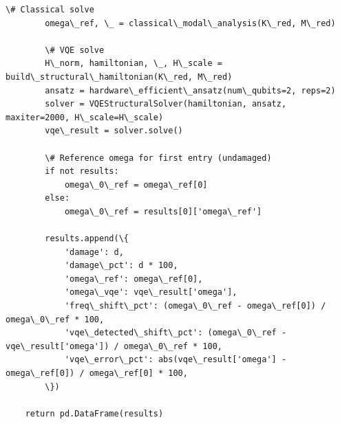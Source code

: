 \documentclass[12pt, a4paper]{article}
\begin{document}
\begin{lstlisting}[style=codestyle, caption={{novel_study.py --- Ill-Conditioning & Damage Detection}}]
        \# Classical solve
        omega\_ref, \_ = classical\_modal\_analysis(K\_red, M\_red)

        \# VQE solve
        H\_norm, hamiltonian, \_, H\_scale = build\_structural\_hamiltonian(K\_red, M\_red)
        ansatz = hardware\_efficient\_ansatz(num\_qubits=2, reps=2)
        solver = VQEStructuralSolver(hamiltonian, ansatz, maxiter=2000, H\_scale=H\_scale)
        vqe\_result = solver.solve()

        \# Reference omega for first entry (undamaged)
        if not results:
            omega\_0\_ref = omega\_ref[0]
        else:
            omega\_0\_ref = results[0]['omega\_ref']

        results.append(\{
            'damage': d,
            'damage\_pct': d * 100,
            'omega\_ref': omega\_ref[0],
            'omega\_vqe': vqe\_result['omega'],
            'freq\_shift\_pct': (omega\_0\_ref - omega\_ref[0]) / omega\_0\_ref * 100,
            'vqe\_detected\_shift\_pct': (omega\_0\_ref - vqe\_result['omega']) / omega\_0\_ref * 100,
            'vqe\_error\_pct': abs(vqe\_result['omega'] - omega\_ref[0]) / omega\_ref[0] * 100,
        \})

    return pd.DataFrame(results)

\end{lstlisting}

\end{document}

